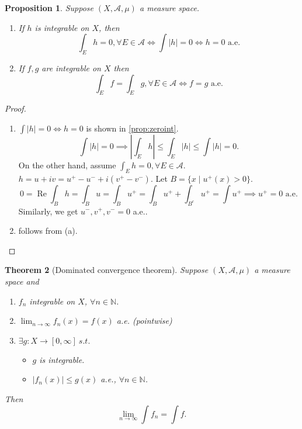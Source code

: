 \documentclass{report}
\newcommand{\N}{\mathbb{N}}
\newcommand{\st}{\ s.t.\ }
\def \re {\operatorname{Re}}
\newtheorem{theorem}{Theorem}[chapter]
\newtheorem{proposition}[theorem]{Proposition}
\theoremstyle{definition}
\theoremstyle{remark}
\begin{document}
\begin{proposition}
	Suppose $(X, \mathcal{A}, \mu)$ a measure space.
	\begin{enumerate}
		\item If $h$ is integrable on $X$, then \[\int_E h = 0, \forall E \in \mathcal{A} \iff \int |h| = 0 \iff h = 0\text{ a.e.}\]
		\item If $f, g$ are integrable on $X$ then \[\int_E f = \int_E g, \forall E \in \mathcal{A} \iff f = g\text{ a.e.}\]
	\end{enumerate}
\end{proposition}
\begin{proof}
	\begin{enumerate}
		\item $\int |h| = 0 \iff h = 0$ is shown in \ref{prop:zeroint}.
		\[
			\int |h| = 0 \implies \left|\int_E h\right| \leq \int_E |h| \leq \int |h| = 0.
		\]
		On the other hand, assume $\int_E h = 0, \forall E \in \mathcal{A}$. $h = u + iv = u^+ - u^- + i(v^+ - v^-)$. Let $B = \{x \mid u^+(x) > 0\}$.
		\[0 = \re\int_B h = \int_B u = \int_B u^+ = \int_B u^+ + \int_{B^c} u^+ = \int u^+ \implies u^+ = 0 \text{ a.e.}\]
		Similarly, we get $u^-, v^+, v^- = 0$ a.e..
		\item follows from (a). \qedhere
	\end{enumerate}
\end{proof}
\begin{theorem}[Dominated convergence theorem]
	Suppose $(X, \mathcal{A}, \mu)$ a measure space and
	\begin{enumerate}
		\item $f_n$ \emph{integrable} on $X$, $\forall n \in \N$.
		\item $\displaystyle \lim_{n \to \infty} f_n(x) = f(x)$ a.e. (pointwise)
		\item $\exists g: X \to [0, \infty] \st$ \begin{itemize}
			\item $g$ is integrable.
			\item $|f_n(x)| \leq g(x)$ a.e., $\forall n \in \N$.
		\end{itemize}
	\end{enumerate}
	Then \[\lim_{n \to \infty} \int f_n = \int f.\]
\end{theorem}
\end{document}
